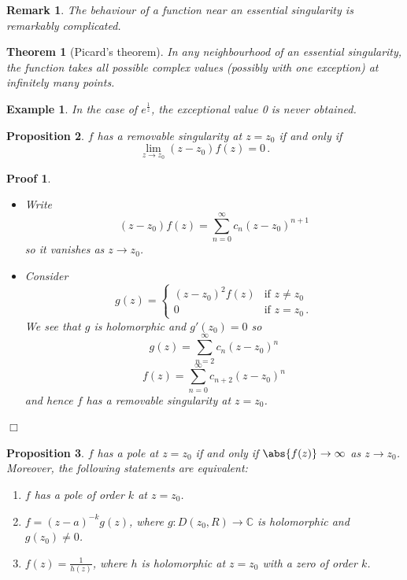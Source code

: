 \documentclass{article}
\theoremstyle{plain}\theoremheaderfont{\normalfont\itshape}\theorembodyfont{\rmfamily}\theoremseparator{.}\newtheorem*{rem}{Remark}\newtheorem*{ex}{Example}\newtheorem*{proof}{Proof}\newtheorem*{altp}{Alternative proof}
\theoremstyle{plain}\theoremheaderfont{\normalfont\bfseries}\theorembodyfont{\rmfamily}\theoremseparator{.}\newtheorem{thm}{Theorem}[section]\newtheorem{lem}[thm]{Lemma}\newtheorem{prop}[thm]{Proposition}\newtheorem*{cor}{Corollary}\newtheorem{defn}[thm]{Definition}\newtheorem{clm}[thm]{Claim}\newtheorem{clminproof}{Claim}
\theoremstyle{break}\theoremheaderfont{\normalfont\itshape}\theorembodyfont{\rmfamily}\theoremseparator{.\medskip}\newtheorem*{proofskip}{Proof}\newtheorem*{exs}{Examples}\newtheorem*{rems}{Remarks}
\theoremstyle{break}\theoremheaderfont{\normalfont\bfseries}\theorembodyfont{\rmfamily}\theoremseparator{.\medskip}\newtheorem{lemskip}[thm]{Lemma}\newtheorem{defnskip}[thm]{Definition}\newtheorem{propskip}[thm]{Proposition}\newtheorem{thmskip}[thm]{Theorem}
\numberwithin{equation}{section}
\newcommand{\qed}{\hfill\ensuremath{\Box}}
\begin{document}
	\begin{rem}
		The behaviour of a function near an essential singularity is remarkably complicated.
	\end{rem}
	\begin{thm}[Picard's theorem]		
		In any neighbourhood of an essential singularity, the function takes all possible complex values (possibly with one exception) at infinitely many points.
	\end{thm}
	\begin{ex}
		In the case of \(e^{\frac{1}{z}}\), the exceptional value 0 is never obtained.
	\end{ex}
	\begin{prop}
		\(f\) has a removable singularity at \(z=z_0\) if and only if
		\[\lim_{z\to z_0}(z-z_0)f(z)=0\,.\]
	\end{prop}
	\begin{proofskip}
		\begin{itemize}[topsep=0pt]
			\item[(\(\Rightarrow\))] Write
			\[(z-z_0)f(z)=\sum_{n=0}^{\infty}c_n(z-z_0)^{n+1}\]
			so it vanishes as \(z\to z_0\).
			\item[(\(\Leftarrow\))] Consider
			\[g(z)=\begin{cases}
				(z-z_0)^2f(z) & \text{if }z\ne z_0\\
				0 & \text{if }z=z_0\,.
			\end{cases}\]
			We see that \(g\) is holomorphic and \(g'(z_0)=0\) so
			\[g(z)=\sum_{n=2}^{\infty}c_n(z-z_0)^n\]
			\[f(z)=\sum_{n=0}^{\infty}c_{n+2}(z-z_0)^n\]
			and hence \(f\) has a removable singularity at \(z=z_0\).
		\end{itemize}\qed
	\end{proofskip}
	\begin{prop}
		\(f\) has a pole at \(z=z_0\) if and only if \(\abs{f(z)}\to\infty\) as \(z\to z_0\). Moreover, the following statements are equivalent:
		\begin{enumerate}[topsep=0pt]
			\item \(f\) has a pole of order \(k\) at \(z=z_0\).
			\item \(f=(z-a)^{-k}g(z)\), where \(g:D(z_0,R)\to\mathbb{C}\) is holomorphic and \(g(z_0)\ne 0\).
			\item \(f(z)=\frac{1}{h(z)}\), where \(h\) is holomorphic at \(z=z_0\) with a zero of order \(k\).
		\end{enumerate}
	\end{prop}
\end{document}
